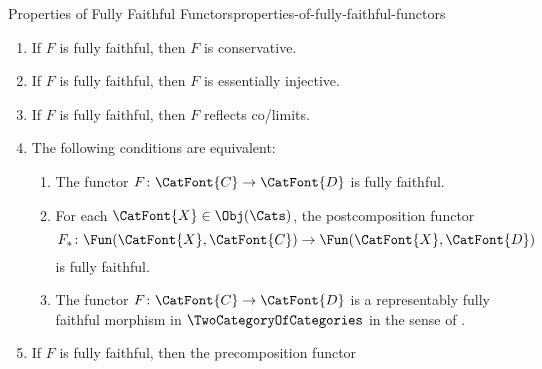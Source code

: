 \begin{proposition}{Properties of Fully Faithful Functors}{properties-of-fully-faithful-functors}
\begin{enumerate}
\begin{enumerate}
\begin{webcompile}
                    \end{webcompile}
                    in $\Cats$.
            \end{enumerate}
        \item\label{properties-of-fully-faithful-functors-conservativity}If $F$ is fully faithful, then $F$ is conservative.
        \item\label{properties-of-fully-faithful-functors-essential-injectivity}If $F$ is fully faithful, then $F$ is essentially injective.
        \item\label{properties-of-fully-faithful-functors-interaction-with-co-limits}If $F$ is fully faithful, then $F$ reflects co/limits.
        \item\label{properties-of-fully-faithful-functors-interaction-with-postcomposition}The following conditions are equivalent:
            \begin{enumerate}
                \item\label{properties-of-fully-faithful-functors-interaction-with-postcomposition-a}The functor $F\colon\CatFont{C}\to\CatFont{D}$ is fully faithful.
                \item\label{properties-of-fully-faithful-functors-interaction-with-postcomposition-b}For each $\CatFont{X}\in\Obj(\Cats)$, the postcomposition functor
                    \[
                        F_{*}
                        \colon
                        \Fun(\CatFont{X},\CatFont{C})
                        \to
                        \Fun(\CatFont{X},\CatFont{D})
                    \]%
                    is fully faithful.
                \item\label{properties-of-fully-faithful-functors-interaction-with-postcomposition-c}The functor $F\colon\CatFont{C}\to\CatFont{D}$ is a representably fully faithful morphism in $\TwoCategoryOfCategories$ in the sense of .
            \end{enumerate}
        \item\label{properties-of-fully-faithful-functors-interaction-with-precomposition-1}If $F$ is fully faithful, then the precomposition functor

\end{enumerate}
\end{proposition}

